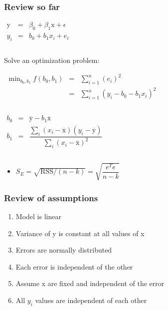 \begin{frame}\frametitle{Review so far}
	
	$ 
	\begin{array}{rcl}
		\mathrm{y} &=& \beta_0 + \beta_1 \mathrm{x} + \epsilon \\
		y_i &=& b_0 + b_1 x_i + e_i \\
		\\
	\end{array}
	$
	
	Solve an optimization problem:
	
	$ 
	\begin{array}{rcl}
		\min_{\displaystyle b_0, b_1} f(b_0, b_1) &=& \sum_{i=1}^{n}{(e_i)^2} \\
		&=& \sum_{i=1}^{n}{\left(y_i - b_0 - b_1 x_i\right)^2} \\
		\\
	\end{array}
	$
	
	$ 
	\begin{array}{rcl}
		b_0 &=& \overline{\mathrm{y}} - b_1\overline{\mathrm{x}} \\
		b_1 &=& \dfrac{ \sum_i{\left(x_i - \overline{\mathrm{x}}\right)\left(y_i - \overline{\mathrm{y}}\right) } }{ \sum_i{\left( x_i - \overline{\mathrm{x}}\right)^2} } \\
		\\
	\end{array}
	$
	\begin{itemize}
		\item	$S_E = \sqrt{\text{RSS}/(n-k)} = \sqrt{\dfrac{ e^Te}{n-k}}$ 
	\end{itemize}
\end{frame}

\begin{frame}\frametitle{Review of assumptions}
	\begin{enumerate}
		\item	Model is linear 
		\item	Variance of y is constant at all values of x 
		\item	Errors are normally distributed 
		\item	Each error is independent of the other 
		\item	Assume x are fixed and independent of the error 
		\item	All $y_i$ values are independent of each other 
	\end{enumerate}
\end{frame}

